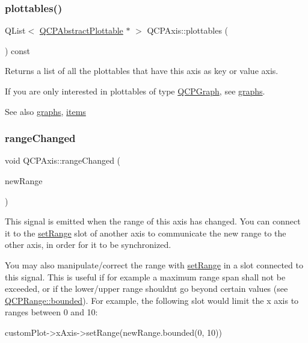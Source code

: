 \subsubsection{\texorpdfstring{plottables()}{plottables()}}
{\footnotesize\ttfamily Q\+List$<$ \hyperlink{classQCPAbstractPlottable}{Q\+C\+P\+Abstract\+Plottable} $\ast$ $>$ Q\+C\+P\+Axis\+::plottables (\begin{DoxyParamCaption}{ }\end{DoxyParamCaption}) const}

Returns a list of all the plottables that have this axis as key or value axis.

If you are only interested in plottables of type \hyperlink{classQCPGraph}{Q\+C\+P\+Graph}, see \hyperlink{classQCPAxis_ad590c0da223697a2727f97a520870fec}{graphs}.

\begin{DoxySeeAlso}{See also}
\hyperlink{classQCPAxis_ad590c0da223697a2727f97a520870fec}{graphs}, \hyperlink{classQCPAxis_a42761bc68e2f3a9f68549d45b73f705b}{items} 
\end{DoxySeeAlso}
\mbox{\label{classQCPAxis_a0894084e4c16a1736534c4095746f910}} 
\subsubsection{\texorpdfstring{range\+Changed}{rangeChanged}\hspace{0.1cm}{\footnotesize\ttfamily [1/2]}}
{\footnotesize\ttfamily void Q\+C\+P\+Axis\+::range\+Changed (\begin{DoxyParamCaption}\item[{const \hyperlink{classQCPRange}{Q\+C\+P\+Range} \&}]{new\+Range }\end{DoxyParamCaption})\hspace{0.3cm}{\ttfamily [signal]}}

This signal is emitted when the range of this axis has changed. You can connect it to the \hyperlink{classQCPAxis_aebdfea5d44c3a0ad2b4700cd4d25b641}{set\+Range} slot of another axis to communicate the new range to the other axis, in order for it to be synchronized.

You may also manipulate/correct the range with \hyperlink{classQCPAxis_aebdfea5d44c3a0ad2b4700cd4d25b641}{set\+Range} in a slot connected to this signal. This is useful if for example a maximum range span shall not be exceeded, or if the lower/upper range shouldn\textquotesingle{}t go beyond certain values (see \hyperlink{classQCPRange_a22151e18d961d762d25721211e89c2e5}{Q\+C\+P\+Range\+::bounded}). For example, the following slot would limit the x axis to ranges between 0 and 10\+: 
\begin{DoxyCode}
customPlot->xAxis->setRange(newRange.bounded(0, 10))
\end{DoxyCode}
 \mbox{\label{classQCPAxis_aac8576288e8e31f16186124bc10dd10d}} 
